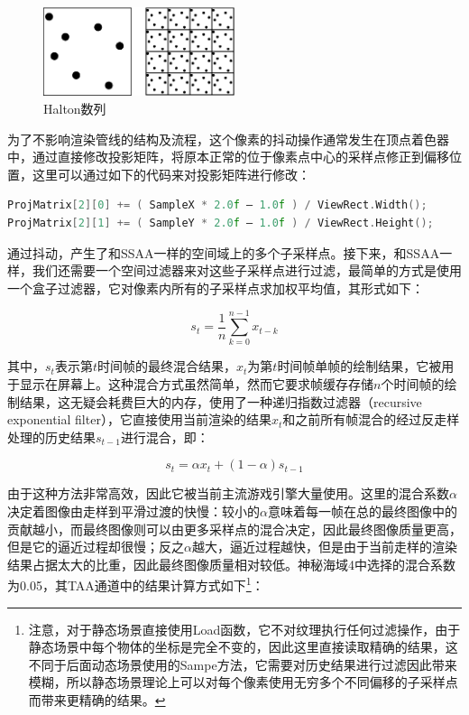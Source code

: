 \begin{figure}
	\sidecaption
	\includegraphics[width=0.5\textwidth]{figures/shade/halton}
	\caption{Halton数列}
	\label{f:shade-halton}
\end{figure}

为了不影响渲染管线的结构及流程，这个像素的抖动操作通常发生在顶点着色器中，通过直接修改投影矩阵，将原本正常的位于像素点中心的采样点修正到偏移位置，这里可以通过如下的代码来对投影矩阵进行修改：

\begin{lstlisting}[language=C++]
ProjMatrix[2][0] += ( SampleX * 2.0f – 1.0f ) / ViewRect.Width();
ProjMatrix[2][1] += ( SampleY * 2.0f – 1.0f ) / ViewRect.Height();
\end{lstlisting}

通过抖动，产生了和SSAA一样的空间域上的多个子采样点。接下来，和SSAA一样，我们还需要一个空间过滤器来对这些子采样点进行过滤，最简单的方式是使用一个盒子过滤器，它对像素内所有的子采样点求加权平均值，其形式如下：

\begin{equation}
	s_t=\frac{1}{n}\sum^{n-1}_{k=0}x_{t-k}
\end{equation}

其中，$s_t$表示第$t$时间帧的最终混合结果，$x_t$为第$t$时间帧单帧的绘制结果，它被用于显示在屏幕上。这种混合方式虽然简单，然而它要求帧缓存存储$n$个时间帧的绘制结果，这无疑会耗费巨大的内存，\cite{a:PixelCorrectShadowMapswithTemporalReprojectionandShadowTestConfidence,a:AcceleratingReal-TimeShadingwithReverseReprojectionCaching}使用了一种递归指数过滤器（recursive exponential filter），它直接使用当前渲染的结果$x_t$和之前所有帧混合的经过反走样处理的历史结果$s_{t-1}$进行混合，即：

\begin{equation}\label{eq:shade-exponential-filter}
	s_t=\alpha x_t+(1-\alpha)s_{t-1}
\end{equation}

由于这种方法非常高效，因此它被当前主流游戏引擎大量使用。这里的混合系数$\alpha$决定着图像由走样到平滑过渡的快慢：较小的$\alpha$意味着每一帧在总的最终图像中的贡献越小，而最终图像则可以由更多采样点的混合决定，因此最终图像质量更高，但是它的逼近过程却很慢；反之$\alpha$越大，逼近过程越快，但是由于当前走样的渲染结果占据太大的比重，因此最终图像质量相对较低。神秘海域4\cite{a:TemporalAntialiasingInUncharted4}中选择的混合系数为0.05，其TAA通道中的结果计算方式如下\footnote{注意，对于静态场景直接使用Load函数，它不对纹理执行任何过滤操作，由于静态场景中每个物体的坐标是完全不变的，因此这里直接读取精确的结果，这不同于后面动态场景使用的Sampe方法，它需要对历史结果进行过滤因此带来模糊，所以静态场景理论上可以对每个像素使用无穷多个不同偏移的子采样点而带来更精确的结果。}：

